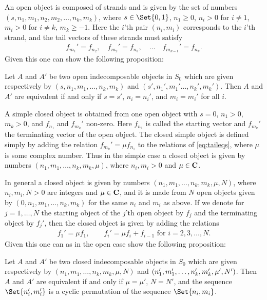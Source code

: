 An open object is composed of strands and is given by the set of numbers $(s,n_1,m_1,n_2,m_2,\dotsc,n_k,m_k)$, where $s\in \Set{0,1}$,  $n_1\geq 0$, $n_i>0$ for $i\neq 1$, $m_i>0$ for $i\neq k$, $m_k\geq -1$. Here the $i$'th pair $(n_i,m_i)$ corresponds to the $i$'th strand, and the tail vectors of these strands must satisfy
\begin{align}\label{eq:taileqs}
  f_{m_1}' = f_{n_2}, \quad f_{m_2}' = f_{n_3}, \quad \dotsc \quad f_{m_{k-1}}' = f_{n_k}.
\end{align}
Given this one can show the following proposition:
\begin{proposition}
  Let $A$ and $A'$ be two open indecomposable objects in $S_0$ which are given respectively by $(s,n_1,m_1,\dotsc,n_k,m_k)$ and $(s',n_1',m_1'\dotsc, n_k',m_k')$. Then $A$ and $A'$ are equivalent if and only if $s=s'$, $n_i=n_i'$, and $m_i=m_i'$ for all $i$.
\end{proposition}

A simple closed object is obtained from one open object with $s=0$, $n_1>0$, $m_k>0$, and $f_{n_1}$ and $f_{m_k}'$ non-zero. Here $f_{n_1}$ is called the starting vector and $f_{m_k}'$ the terminating vector of the open object. The closed simple object is defined simply by adding the relation $f_{m_k}'=\mu f_{n_1}$ to the relations of \cref{eq:taileqs}, where $\mu$ is some complex number. Thus in the simple case a closed object is given by numbers $(n_1,m_1,\dotsc,n_k,m_k,\mu)$, where $n_i,m_i>0$ and $\mu\in\mathbf{C}$.

In general a closed object is given by numbers $(n_1,m_1,\dotsc,n_k,m_k,\mu,N)$, where $n_i,m_i,N>0$ are integers and $\mu\in\mathbf{C}$, and it is made from $N$ open objects given by $(0,n_1,m_1,\dotsc,n_k,m_k)$ for the same $n_i$ and $m_i$ as above. If we denote for $j=1,\dotsc,N$ the starting object of the $j$'th open object by $f_j$ and the terminating object by $f_j'$, then the closed object is given by adding the relations 
\begin{align*}
  f_1' = \mu f_1, \qquad f_i' = \mu f_i + f_{i-1} \mbox{ for }i=2,3,\dotsc,N.
\end{align*}
Given this one can as in the open case show the following proposition:
\begin{proposition}
  Let $A$ and $A'$ be two closed indecomposable objects in $S_0$ which are given respectively by $(n_1,m_1,\dotsc,n_k,m_k,\mu,N)$ and $(n_1',m_1',\dotsc,n_k',m_k', \\ \mu',N')$. Then $A$ and $A'$ are equivalent if and only if $\mu=\mu'$, $N=N'$, and the sequence $\Set{n_i',m_i'}$ is a cyclic permutation of the sequence $\Set{n_i,m_i}$. 
\end{proposition}

